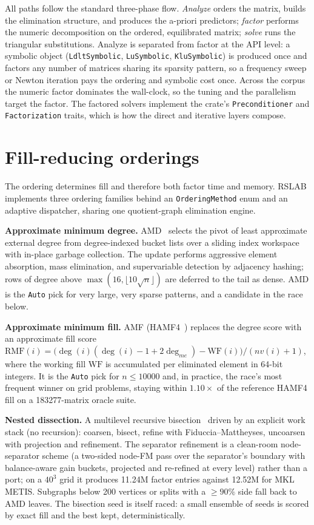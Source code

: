 \documentclass[11pt,a4paper]{article}
\newcommand{\rT}{\textsf{RSLAB}}
\newcommand{\code}[1]{\texttt{\small #1}}
\begin{document}
All paths follow the standard three-phase flow. \emph{Analyze} orders the matrix, builds
the elimination structure, and produces the a-priori predictors; \emph{factor} performs
the numeric decomposition on the ordered, equilibrated matrix; \emph{solve} runs the
triangular substitutions. Analyze is separated from factor at the API level: a symbolic
object (\code{LdltSymbolic}, \code{LuSymbolic}, \code{KluSymbolic}) is produced once and
factors any number of matrices sharing its sparsity pattern, so a frequency sweep or
Newton iteration pays the ordering and symbolic cost once. Across the corpus the numeric
factor dominates the wall-clock, so the tuning and the parallelism target the factor.
The factored solvers implement the crate's \code{Preconditioner} and
\code{Factorization} traits, which is how the direct and iterative layers compose.

\section{Fill-reducing orderings}
\label{sec:ordering}
The ordering determines fill and therefore both factor time and memory. \rT{} implements
three ordering families behind an \code{OrderingMethod} enum and an adaptive dispatcher,
sharing one quotient-graph elimination engine.

\textbf{Approximate minimum degree.} AMD~\cite{amd} selects the pivot of least
approximate external degree from degree-indexed bucket lists over a sliding index
workspace with in-place garbage collection. The update performs aggressive element
absorption, mass elimination, and supervariable detection by adjacency hashing; rows of
degree above $\max(16,\lfloor10\sqrt n\rfloor)$ are deferred to the tail as dense. AMD is the
\code{Auto} pick for very large, very sparse patterns, and a candidate in the race below.

\textbf{Approximate minimum fill.} AMF (HAMF4~\cite{amf,rothberg-minfill}) replaces the
degree score with an approximate fill score
$\mathrm{RMF}(i)=\bigl(\deg(i)(\deg(i)-1+2\deg_{me})-\mathrm{WF}(i)\bigr)/(nv(i)+1)$,
where the working fill $\mathrm{WF}$ is accumulated per eliminated element in 64-bit
integers. It is the \code{Auto} pick for $n\le\num{10000}$ and, in practice, the race's most
frequent winner on grid problems, staying within $1.10\times$ of the reference HAMF4
fill on a \num{183277}-matrix oracle suite.

\textbf{Nested dissection.} A multilevel recursive bisection~\cite{george,metis} driven
by an explicit work stack (no recursion): coarsen, bisect, refine with
Fiduccia--Mattheyses, uncoarsen with projection and refinement. The separator refinement
is a clean-room node-separator scheme (a two-sided node-FM pass over the separator's
boundary with balance-aware gain buckets, projected and re-refined at every level)
rather than a port; on a $40^3$ grid it produces \num{11.24}M factor entries against
\num{12.52}M for MKL METIS. Subgraphs below 200 vertices or splits with a $\ge90\%$ side
fall back to AMD leaves. The bisection seed is itself raced: a small ensemble of seeds is
scored by exact fill and the best kept, deterministically.
\end{document}

